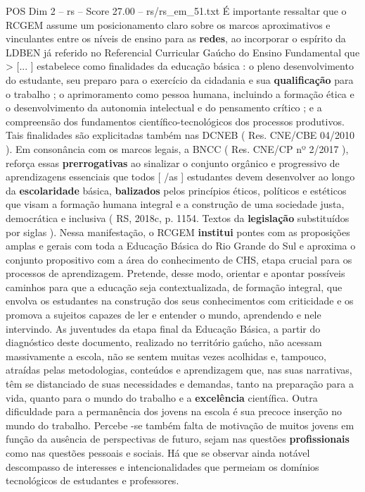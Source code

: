 \begin{textsample}{POS Dim 2 – rs – Score 27.00 – rs/rs\_em\_51.txt}
É importante ressaltar que o RCGEM assume um posicionamento claro sobre os marcos aproximativos e vinculantes entre os níveis de ensino para as \textbf{redes}, ao incorporar o espírito da LDBEN já referido no Referencial Curricular Gaúcho do Ensino Fundamental que > [... ] estabelece como finalidades da educação básica : o pleno desenvolvimento do estudante, seu preparo para o exercício da cidadania e sua \textbf{qualificação} para o trabalho ; o aprimoramento como pessoa humana, incluindo a formação ética e o desenvolvimento da autonomia intelectual e do pensamento crítico ; e a compreensão dos fundamentos científico-tecnológicos dos processos produtivos.
Tais finalidades são explicitadas também nas DCNEB ( Res.
CNE/CBE 04/2010 ).
Em consonância com os marcos legais, a BNCC ( Res.
CNE/CP nº 2/2017 ), reforça essas \textbf{prerrogativas} ao sinalizar o conjunto orgânico e progressivo de aprendizagens essenciais que todos [ /as ] estudantes devem desenvolver ao longo da \textbf{escolaridade} básica, \textbf{balizados} pelos princípios éticos, políticos e estéticos que visam a formação humana integral e a construção de uma sociedade justa, democrática e inclusiva ( RS, 2018c, p. 1154.
Textos da \textbf{legislação} substituídos por siglas ).
Nessa manifestação, o RCGEM \textbf{institui} pontes com as proposições amplas e gerais com toda a Educação Básica do Rio Grande do Sul e aproxima o conjunto propositivo com a área do conhecimento de CHS, etapa crucial para os processos de aprendizagem.
Pretende, desse modo, orientar e apontar possíveis caminhos para que a educação seja contextualizada, de formação integral, que envolva os estudantes na construção dos seus conhecimentos com criticidade e os promova a sujeitos capazes de ler e entender o mundo, aprendendo e nele intervindo.
As juventudes da etapa final da Educação Básica, a partir do diagnóstico deste documento, realizado no território gaúcho, não acessam massivamente a escola, não se sentem muitas vezes acolhidas e, tampouco, atraídas pelas metodologias, conteúdos e aprendizagem que, nas suas narrativas, têm se distanciado de suas necessidades e demandas, tanto na preparação para a vida, quanto para o mundo do trabalho e a \textbf{excelência} científica.
Outra dificuldade para a permanência dos jovens na escola é sua precoce inserção no mundo do trabalho.
Percebe -se também falta de motivação de muitos jovens em função da ausência de perspectivas de futuro, sejam nas questões \textbf{profissionais} como nas questões pessoais e sociais.
Há que se observar ainda notável descompasso de interesses e intencionalidades que permeiam os domínios tecnológicos de estudantes e professores.

\end{textsample}
